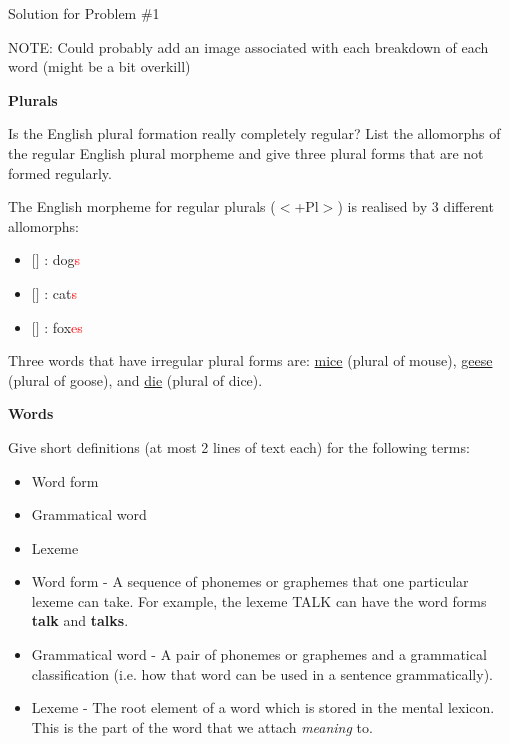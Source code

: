 \documentclass[11pt]{article}
\begin{document}
\begin{solution}
Solution for Problem \#1

NOTE: Could probably add an image associated with each breakdown of each word (might be a bit overkill)
\end{solution}

\vspace*{0.5cm} %

\begin{problem}{2}
\textbf{Plurals}

Is the English plural formation really completely regular? List the allomorphs of the regular English plural morpheme and give three plural forms that are not formed regularly.
\end{problem}

\begin{solution}
The English morpheme for regular plurals ($<$+Pl$>$) is realised by 3 different allomorphs:
\begin{itemize}
	\item $[$$]$ : dog\textcolor{red}{s}
	\item $[$$]$ : cat\textcolor{red}{s}
	\item $[$$]$ : fox\textcolor{red}{es}
\end{itemize}

Three words that have irregular plural forms are: \underline{mice} (plural of mouse), \underline{geese} (plural of goose), and \underline{die} (plural of dice). 

\end{solution}

\vspace*{0.5cm}

\begin{problem}{3}
\textbf{Words}

Give short definitions (at most 2 lines of text each) for the following terms:
\begin{itemize}
	\item Word form
	\item Grammatical word
	\item Lexeme
\end{itemize}

\end{problem}

\begin{solution}
\begin{itemize}
	\item Word form - A sequence of phonemes or graphemes that one particular lexeme can take.  For example, the lexeme TALK can have the word forms \textbf{talk} and \textbf{talks}.
	\item Grammatical word - A pair of phonemes or graphemes and a grammatical classification (i.e. how that word can be used in a sentence grammatically).
	\item Lexeme - The root element of a word which is stored in the mental lexicon.  This is the part of the word that we attach \textit{meaning} to.
\end{itemize}
\end{solution}
\end{document}
